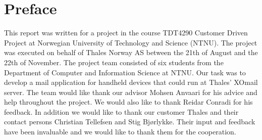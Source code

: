 \chapter*{Preface}

This report was written for a project in the course TDT4290 Customer Driven Project at Norwegian University of Technology and Science (NTNU). The project was executed on behalf of Thales Norway AS between the 21th of August and the 22th of November.
\newline
\newline
The project team consisted of six students from the Department of Computer and Information Science at NTNU. Our task was to develop a mail application for handheld devices that could run at Thales' XOmail server.
\newline
\newline
The team would like thank our advisor Mohsen Anvaari for his advice and help throughout the project. We would also like to thank Reidar Conradi for his feedback. 
\newline
\newline
In addition we would like to thank our customer Thales and their contact persons Christian Tellefsen and Stig Bjørlykke. Their input and feedback have been invaluable and we would like to thank them for the cooperation. 
